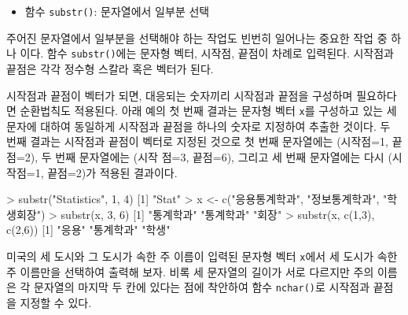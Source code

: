 \documentclass[
]{book}
\newenvironment{Shaded}{\begin{snugshade}}{\end{snugshade}}
\newcommand{\DecValTok}[1]{\textcolor[rgb]{0.00,0.00,0.81}{#1}}
\newcommand{\FunctionTok}[1]{\textcolor[rgb]{0.00,0.00,0.00}{#1}}
\newcommand{\NormalTok}[1]{#1}
\newcommand{\OtherTok}[1]{\textcolor[rgb]{0.56,0.35,0.01}{#1}}
\newcommand{\SpecialCharTok}[1]{\textcolor[rgb]{0.00,0.00,0.00}{#1}}
\newcommand{\StringTok}[1]{\textcolor[rgb]{0.31,0.60,0.02}{#1}}
\providecommand{\tightlist}{%
  \setlength{\itemsep}{0pt}\setlength{\parskip}{0pt}}
\begin{document}
\begin{itemize}
\tightlist
\item
  함수 \texttt{substr()}: 문자열에서 일부분 선택
\end{itemize}

주어진 문자열에서 일부분을 선택해야 하는 작업도 빈번히 일어나는 중요한 작업 중 하나
이다. 함수 \texttt{substr()}에는 문자형 벡터, 시작점, 끝점이 차례로 입력된다. 시작점과 끝점은
각각 정수형 스칼라 혹은 벡터가 된다.

시작점과 끝점이 벡터가 되면, 대응되는 숫자끼리 시작점과 끝점을 구성하며 필요하다면 순환법칙도 적용된다.
아래 예의 첫 번째 결과는 문자형 벡터 \texttt{x}를 구성하고 있는 세 문자에 대하여 동일하게
시작점과 끝점을 하나의 숫자로 지정하여 추출한 것이다. 두 번째 결과는 시작점과 끝점이
벡터로 지정된 것으로 첫 번째 문자열에는 (시작점=1, 끝점=2), 두 번째 문자열에는 (시작
점=3, 끝점=6), 그리고 세 번째 문자열에는 다시 (시작점=1, 끝점=2)가 적용된 결과이다.

\begin{Shaded}
\begin{Highlighting}[]
\SpecialCharTok{\textgreater{}} \FunctionTok{substr}\NormalTok{(}\StringTok{"Statistics"}\NormalTok{, }\DecValTok{1}\NormalTok{, }\DecValTok{4}\NormalTok{)}
\NormalTok{[}\DecValTok{1}\NormalTok{] }\StringTok{"Stat"}
\SpecialCharTok{\textgreater{}}\NormalTok{ x }\OtherTok{\textless{}{-}} \FunctionTok{c}\NormalTok{(}\StringTok{"응용통계학과"}\NormalTok{, }\StringTok{"정보통계학과"}\NormalTok{, }\StringTok{"학생회장"}\NormalTok{) }
\SpecialCharTok{\textgreater{}} \FunctionTok{substr}\NormalTok{(x, }\DecValTok{3}\NormalTok{, }\DecValTok{6}\NormalTok{)}
\NormalTok{[}\DecValTok{1}\NormalTok{] }\StringTok{"통계학과"} \StringTok{"통계학과"} \StringTok{"회장"}    
\SpecialCharTok{\textgreater{}} \FunctionTok{substr}\NormalTok{(x, }\FunctionTok{c}\NormalTok{(}\DecValTok{1}\NormalTok{,}\DecValTok{3}\NormalTok{), }\FunctionTok{c}\NormalTok{(}\DecValTok{2}\NormalTok{,}\DecValTok{6}\NormalTok{))}
\NormalTok{[}\DecValTok{1}\NormalTok{] }\StringTok{"응용"}     \StringTok{"통계학과"} \StringTok{"학생"}    
\end{Highlighting}
\end{Shaded}

미국의 세 도시와 그 도시가 속한 주 이름이 입력된 문자형 벡터 \texttt{x}에서 세 도시가 속한
주 이름만을 선택하여 출력해 보자. 비록 세 문자열의 길이가 서로 다르지만 주의 이름은
각 문자열의 마지막 두 칸에 있다는 점에 착안하여 함수 \texttt{nchar()}로 시작점과 끝점을 지정할 수 있다.
\end{document}
